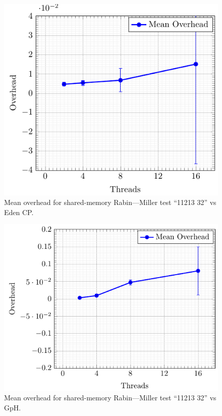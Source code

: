 \documentclass[paper=A4,twoside=true,openright,parskip=full,chapterprefix=true,headings=normal,bibliography=totoc,listof=totoc,titlepage=on,captions=tableabove,draft=false,british]{scrreprt}%
\renewcommand{\enquote}[1]{{``}#1{''}}
\begin{document}
\begin{figure}[h]
\centering
\includegraphics{src/img/overSMRM32Eden.pdf}
\caption{Mean overhead for shared-memory Rabin---Miller test
\enquote{11213 32} vs Eden CP.\label{fig:overSMRM32Eden}}
\end{figure}

\begin{figure}[h]
\centering
\includegraphics{src/img/overSMRM32GpH.pdf}
\caption{Mean overhead for shared-memory Rabin---Miller test
\enquote{11213 32} vs GpH.\label{fig:overSMRM32GpH}}
\end{figure}
\end{document}
